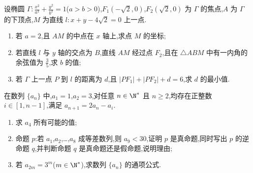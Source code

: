 \begin{problem}
设椭圆 \(\Gamma:\frac{x^2}{a^2}+\frac{y^2}{b^2}=1\)(\(a>b>0\)),\(F_1(-\sqrt2,0)\),\(F_2(\sqrt2,0)\) 为 \(\Gamma\) 的焦点,\(A\) 为 \(\Gamma\) 的下顶点,\(M\) 为直线 \(l:x+y-4\sqrt2=0\) 上一点.
\begin{enumerate}
\item 若 \(a=2\),且 \(AM\) 的中点在 \(x\) 轴上,求点 \(M\) 的坐标;
\item 若直线 \(l\) 与 \(y\) 轴的交点为 \(B\),直线 \(AM\) 经过点 \(F_2\),且在 \(\triangle ABM\) 中有一内角的余弦值为 \(\frac35\),求 \(b\) 的值;
\item 若 \(\Gamma\) 上一点 \(P\) 到 \(l\) 的距离为 \(d\),且 \(|PF_1|+|PF_2|+d=6\),求 \(d\) 的最小值.
\end{enumerate}
\end{problem}

\begin{problem}
在数列 \(\{a_n\}\) 中,\(a_1=1\),\(a_2=3\),对任意 \(n\in\N^*\) 且 \(n\ge2\),均存在正整数 \(i\in[1,n-1]\),满足 \(a_{n+1}=2a_n-a_i\).
\begin{enumerate}
\item 求 \(a_4\) 所有可能的值;
\item 命题 \(p\):若 \(a_1\),\(a_2\),\ldots,\(a_8\) 成等差数列,则 \(a_9<30\),证明 \(p\) 是真命题,同时写出 \(p\) 的逆命题 \(q\),并判断命题 \(q\) 是真命题还是假命题,说明理由;
\item 若 \(a_{2m}=3^m\)(\(m\in\N^*\)),求数列 \(\{a_n\}\) 的通项公式.
\end{enumerate}
\end{problem}

